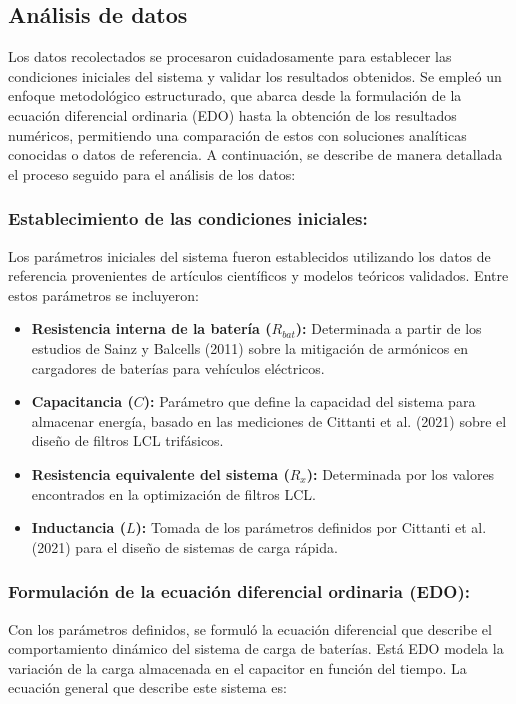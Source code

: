 \subsection{Análisis de datos}
Los datos recolectados se procesaron cuidadosamente para establecer las condiciones iniciales del
sistema y validar los resultados obtenidos. Se empleó un enfoque metodológico estructurado, que
abarca desde la formulación de la ecuación diferencial ordinaria (EDO) hasta la obtención de los
resultados numéricos, permitiendo una comparación de estos con soluciones analíticas conocidas o
datos de referencia. A continuación, se describe de manera detallada el proceso seguido para el
análisis de los datos:

\subsubsection*{Establecimiento de las condiciones iniciales:}
Los parámetros iniciales del sistema fueron establecidos utilizando los datos de referencia
provenientes de artículos científicos y modelos teóricos validados. Entre estos parámetros se
incluyeron:

\begin{itemize}
    \item \textbf{Resistencia interna de la batería (\(R_{bat}\)):} Determinada a partir de los estudios de Sainz y Balcells (2011) sobre la mitigación de armónicos en cargadores de baterías para vehículos eléctricos.

    \item \textbf{Capacitancia (\(C\)):} Parámetro que define la capacidad del sistema para almacenar energía, basado en las mediciones de Cittanti et al. (2021) sobre el diseño de filtros LCL trifásicos.

    \item \textbf{Resistencia equivalente del sistema (\(R_x\)):} Determinada por los valores encontrados en la optimización de filtros LCL.

    \item \textbf{Inductancia (\(L\)):} Tomada de los parámetros definidos por Cittanti et al. (2021) para el diseño de sistemas de carga rápida.
\end{itemize}

\subsubsection*{Formulación de la ecuación diferencial ordinaria (EDO):}
Con los parámetros definidos, se formuló la ecuación diferencial que describe el
comportamiento dinámico del sistema de carga de baterías. Está EDO modela la variación de
la carga almacenada en el capacitor en función del tiempo. La ecuación general que describe
este sistema es:

